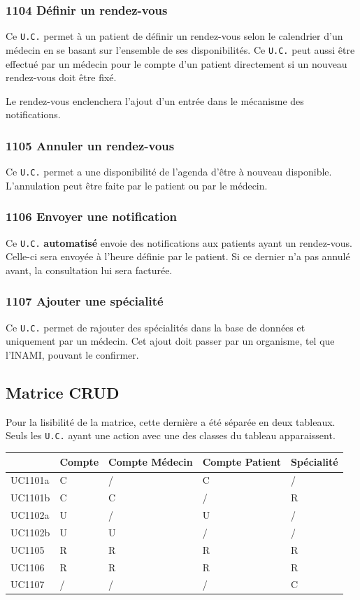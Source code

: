 \subsubsection{\label{1104}1104 Définir un rendez-vous}
Ce \texttt{U.C.} permet à un patient de définir un rendez-vous selon le
calendrier d'un médecin en se basant sur l'ensemble de ses disponibilités. 
Ce \texttt{U.C.} peut aussi être effectué par un médecin pour le compte d'un
patient directement si un nouveau rendez-vous doit être fixé.

Le rendez-vous enclenchera l'ajout d'un entrée dans le mécanisme des
notifications.
\subsubsection{\label{1105}1105 Annuler un rendez-vous}
Ce \texttt{U.C.} permet a une disponibilité de l'agenda d'être à nouveau
disponible. L'annulation peut être faite par le patient ou par le médecin. 
\subsubsection{\label{1106}1106 Envoyer une notification}
Ce \texttt{U.C.} \textbf{automatisé} envoie des notifications aux patients ayant
un rendez-vous. Celle-ci sera envoyée à l'heure définie par le patient. Si ce 
dernier n'a pas annulé avant, la consultation lui sera facturée.
\subsubsection{\label{1107}1107 Ajouter une spécialité}
Ce \texttt{U.C.} permet de rajouter des spécialités dans la base de données et
uniquement par un médecin. Cet ajout doit passer par un organisme, tel que
l'INAMI, pouvant le confirmer.
\newpage
\subsection{Matrice CRUD}

Pour la lisibilité de la matrice, cette dernière a été séparée en deux tableaux.
Seuls les \texttt{U.C.} ayant une action avec une des classes du tableau apparaissent.

\begin{center}
	\begin{longtable}{|p{1.5cm}|p{1.5cm}|p{1.5cm}|p{1.5cm}|p{1.5cm}|}
		\hline
		& Compte & Compte Médecin & Compte Patient & Spécialité \\
		\hline
		UC1101a & C & / & C & / \\
		\hline
		UC1101b & C & C & / & R \\
		\hline
		UC1102a & U & / & U & / \\
		\hline
        UC1102b & U & U & / & / \\
        \hline
		UC1105  & R & R & R & R \\
		\hline
		UC1106 & R & R & R & R \\
		\hline
        UC1107 & / & / & / & C \\
        \hline

	\end{longtable}
\end{center}

